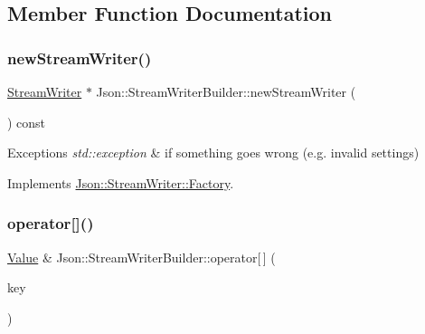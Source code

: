 \subsection{Member Function Documentation}
\mbox{\label{classJson_1_1StreamWriterBuilder_ab9ee278609f88ae04a7c1a84e1f559e6}} 
\subsubsection{\texorpdfstring{new\+Stream\+Writer()}{newStreamWriter()}}
{\footnotesize\ttfamily \hyperlink{classJson_1_1StreamWriter}{Stream\+Writer} $\ast$ Json\+::\+Stream\+Writer\+Builder\+::new\+Stream\+Writer (\begin{DoxyParamCaption}{ }\end{DoxyParamCaption}) const\hspace{0.3cm}{\ttfamily [virtual]}}


\begin{DoxyExceptions}{Exceptions}
{\em std\+::exception} & if something goes wrong (e.\+g. invalid settings) \\
\hline
\end{DoxyExceptions}


Implements \hyperlink{classJson_1_1StreamWriter_1_1Factory_a9d30ec53e8288cd53befccf1009c5f31}{Json\+::\+Stream\+Writer\+::\+Factory}.

\mbox{\label{classJson_1_1StreamWriterBuilder_af68f6b59cb20b074052ed12bb3d336a3}} 
\subsubsection{\texorpdfstring{operator[]()}{operator[]()}}
{\footnotesize\ttfamily \hyperlink{classJson_1_1Value}{Value} \& Json\+::\+Stream\+Writer\+Builder\+::operator\mbox{[}$\,$\mbox{]} (\begin{DoxyParamCaption}\item[{J\+S\+O\+N\+C\+P\+P\+\_\+\+S\+T\+R\+I\+NG}]{key }\end{DoxyParamCaption})}


